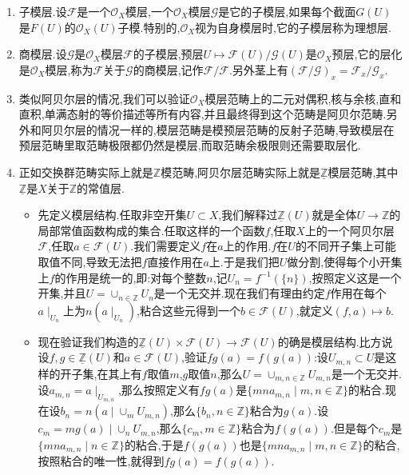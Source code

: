 \begin{enumerate}
\begin{proof}
		回顾一下层化的具体构造.对开集$U\subset X$,层化$F^*(U)$是$\prod_{x\in U}F_x$中这样的元$(t_x)_{x\in U}$构成,满足对任意$x\in U$,都存在开邻域$W_x\subset U$,存在$s\in F(W_x)$使得$y\in W_x$时总有$t_y=s_y$.定义$F^*(U)$上的$\mathscr{O}_X(U)$模结构为$(s,(t_x))\mapsto(s_xt_x)$.另外层化的典范态射$F(U)\to F^*(U)$就是把$s\in F(U)$映射为$(s_x)_{x\in U}$.容易验证这个映射和模结构可交换.
	\end{proof}
	\item 子模层.设$\mathscr{F}$是一个$\mathscr{O}_X$模层,一个$\mathscr{O}_X$模层$\mathscr{G}$是它的子模层,如果每个截面$G(U)$是$F(U)$的$\mathscr{O}_X(U)$子模.特别的,$\mathscr{O}_X$视为自身模层时,它的子模层称为理想层.
	\item 商模层.设$\mathscr{G}$是$\mathscr{O}_X$模层$\mathscr{F}$的子模层,预层$U\mapsto\mathscr{F}(U)/\mathscr{G}(U)$是$\mathscr{O}_X$预层,它的层化是$\mathscr{O}_X$模层,称为$\mathscr{F}$关于$\mathscr{G}$的商模层,记作$\mathscr{F}/\mathscr{F}$.另外茎上有$(\mathscr{F}/\mathscr{G})_x=\mathscr{F}_x/\mathscr{G}_x$.
	\item 类似阿贝尔层的情况,我们可以验证$\mathscr{O}_X$模层范畴上的二元对偶积,核与余核,直和直积,单满态射的等价描述等所有内容,并且最终得到这个范畴是阿贝尔范畴.另外和阿贝尔层的情况一样的,模层范畴是模预层范畴的反射子范畴,导致模层在预层范畴里取范畴极限都仍然是模层,而取范畴余极限则还需要取层化.
	\item 正如交换群范畴实际上就是$\mathbb{Z}$模范畴,阿贝尔层范畴实际上就是$\underline{\mathbb{Z}}$模层范畴,其中$\underline{\mathbb{Z}}$是$X$关于$\mathbb{Z}$的常值层.
	\begin{itemize}
		\item 先定义模层结构.任取非空开集$U\subset X$,我们解释过$\underline{\mathbb{Z}}(U)$就是全体$U\to\mathbb{Z}$的局部常值函数构成的集合.任取这样的一个函数$f$,任取$X$上的一个阿贝尔层$\mathscr{F}$,任取$a\in\mathscr{F}(U)$.我们需要定义$f$在$a$上的作用.$f$在$U$的不同开子集上可能取值不同,导致无法把$f$直接作用在$a$上.于是我们把$U$做分割,使得每个小开集上$f$的作用是统一的,即:对每个整数$n$,记$U_n=f^{-1}(\{n\})$,按照定义这是一个开集,并且$U=\cup_{n\in\mathbb{Z}}U_n$是一个无交并.现在我们有理由约定$f$作用在每个$a\mid_{U_n}$上为$n(a\mid_{U_n})$,粘合这些元得到一个$b\in\mathscr{F}(U)$,就定义$(f,a)\mapsto b$.
		\item 现在验证我们构造的$\underline{\mathbb{Z}}(U)\times\mathscr{F}(U)\to\mathscr{F}(U)$的确是模层结构.比方说设$f,g\in\underline{\mathbb{Z}}(U)$和$a\in\mathscr{F}(U)$,验证$fg(a)=f(g(a))$:设$U_{m,n}\subset U$是这样的开子集,在其上有$f$取值$m$,$g$取值$n$,那么$U=\cup_{m,n\in\mathbb{Z}}U_{m,n}$是一个无交并.设$a_{m,n}=a\mid_{U_{m,n}}$,那么按照定义有$fg(a)$是$\{mna_{m,n}\mid m,n\in\mathbb{Z}\}$的粘合.现在设$b_n=n(a\mid\cup_mU_{m,n})$,那么$\{b_n,n\in\mathbb{Z}\}$粘合为$g(a)$.设$c_m=mg(a)\mid\cup_nU_{m,n}$,那么$\{c_m,m\in\mathbb{Z}\}$粘合为$f(g(a))$.但是每个$c_m$是$\{mna_{m,n}\mid n\in\mathbb{Z}\}$的粘合,于是$f(g(a))$也是$\{mna_{m,n}\mid m,n\in\mathbb{Z}\}$的粘合,按照粘合的唯一性,就得到$fg(a)=f(g(a))$.

\end{itemize}
\end{enumerate}
